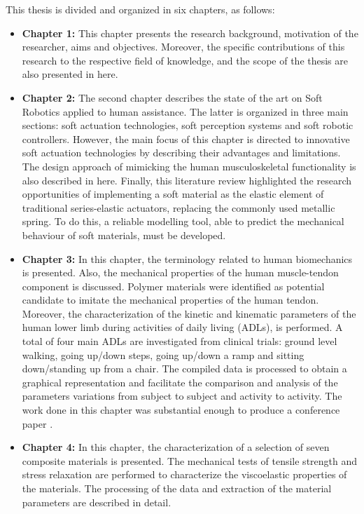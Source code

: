 This thesis is divided and organized in six chapters, as follows:
\begin{itemize}
    \item {\bf Chapter 1: } This chapter presents the research background, motivation of the researcher, aims and objectives. Moreover, the specific contributions of this research to the respective field of knowledge, and the scope of the thesis are also presented in here.
    \item {\bf Chapter 2:} The second chapter describes the state of the art on Soft Robotics applied to human assistance. The latter is organized in three main sections: soft actuation technologies, soft perception systems and soft robotic controllers. However, the main focus of this chapter is directed to innovative soft actuation technologies by describing their advantages and limitations. The design approach of mimicking the human musculoskeletal functionality is also described in here.  Finally, this literature review highlighted the research opportunities of implementing a soft material as the elastic element of traditional series-elastic actuators, replacing the commonly used metallic spring. To do this, a reliable modelling tool, able to predict the mechanical behaviour of soft materials, must be developed.
    \item {\bf Chapter 3:} In this chapter, the terminology related to human biomechanics is presented. Also, the mechanical properties of the human muscle-tendon component is discussed. Polymer materials were identified as potential candidate to imitate the mechanical properties of the human tendon. Moreover, the characterization of the kinetic and kinematic parameters of the human lower limb during activities of daily living (ADLs), is performed. A total of four main ADLs are investigated from clinical trials: ground level walking, going up/down steps, going up/down a ramp and sitting down/standing up from a chair. The compiled data is processed to obtain a graphical representation and facilitate the comparison and analysis of the parameters variations from subject to subject and activity to activity. The work done in this chapter was substantial enough to produce a conference paper \cite{solis2017characterization}.
    \item {\bf Chapter 4: } In this chapter, the characterization of a selection of seven composite materials is presented. The mechanical tests of tensile strength and stress relaxation are performed to characterize the viscoelastic properties of the materials. The processing of the data and extraction of the material parameters are described in detail.

\end{itemize}
